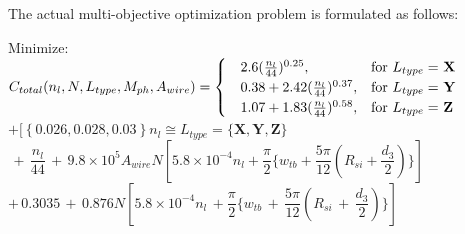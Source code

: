 The actual multi-objective optimization problem is formulated as follows:



\begin{singlespacing}

\begin{flushleft}



Minimize:   \\
$ C_{total} (n_{l}, N, L_{type}, M_{ph}, A_{wire}) = 
\begin{cases}
\quad 2.6(\frac{n_{l}}{44})^{0.25}, & \text{for $L_{type} =$ \textbf{X}} \\
\quad 0.38 + 2.42(\frac{n_{l}}{44})^{0.37}, & \text{for $L_{type} =$ \textbf{Y}} \\
\quad 1.07 + 1.83(\frac{n_{l}}{44})^{0.58}, & \text{for $L_{type} =$ \textbf{Z}} 
\end{cases} $ \\

$
+  [ \left\{0.026, 0.028, 0.03\right\}n_{l} \cong L_{type} = \{ \textbf{X}, \textbf{Y}, \textbf{Z} \} $\\
$
\, + \, \dfrac{n_{l}}{44} \, + \,   9.8 \times 10^{5} A_{wire} N [ 5.8  \times  10^{-4} n_{l}
   +  \dfrac{\pi}{2} \{ w_{tb} + \dfrac{5\pi}{12}(R_{si} + \dfrac{d_{3}}{2}) \}]
$ \\

$
+ \, 0.3035 \, + \, 0.876 N [ 5.8 \times 10^{-4} n_{l} \, + 
 \dfrac{\pi}{2} \{ w_{tb} \, + \, \dfrac{5 \pi}{12}(R_{si} \, + \, \dfrac{d_{3}}{2})\}]
$\\


\end{flushleft}
\end{singlespacing}
